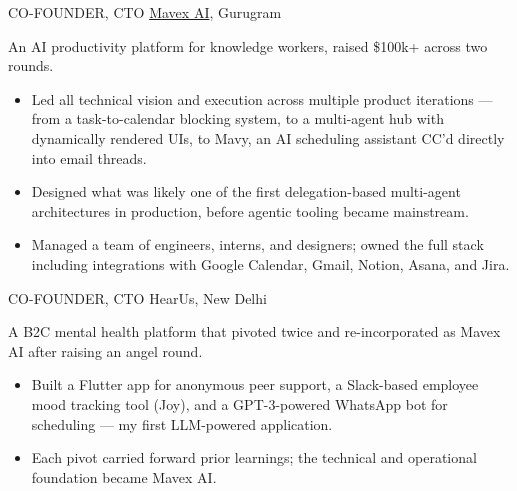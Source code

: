     {
        CO-FOUNDER, CTO
    }
    {
        \href{https://mavex.ai}{Mavex AI}, Gurugram
    }
    {
        An AI productivity platform for knowledge workers, raised \$100k+ across two rounds.

        \begin{itemize}
            \item Led all technical vision and execution across multiple product iterations --- from a task-to-calendar blocking system, to a multi-agent hub with dynamically rendered UIs, to Mavy, an AI scheduling assistant CC'd directly into email threads.
            \item Designed what was likely one of the first delegation-based multi-agent architectures in production, before agentic tooling became mainstream.
            \item Managed a team of engineers, interns, and designers; owned the full stack including integrations with Google Calendar, Gmail, Notion, Asana, and Jira.
        \end{itemize}
    }


    {
        CO-FOUNDER, CTO
    }
    {
        HearUs, New Delhi
    }
    {
        A B2C mental health platform that pivoted twice and re-incorporated as Mavex AI after raising an angel round.

        \begin{itemize}
            \item Built a Flutter app for anonymous peer support, a Slack-based employee mood tracking tool (Joy), and a GPT-3-powered WhatsApp bot for scheduling --- my first LLM-powered application.
            \item Each pivot carried forward prior learnings; the technical and operational foundation became Mavex AI.
        \end{itemize}
    }

